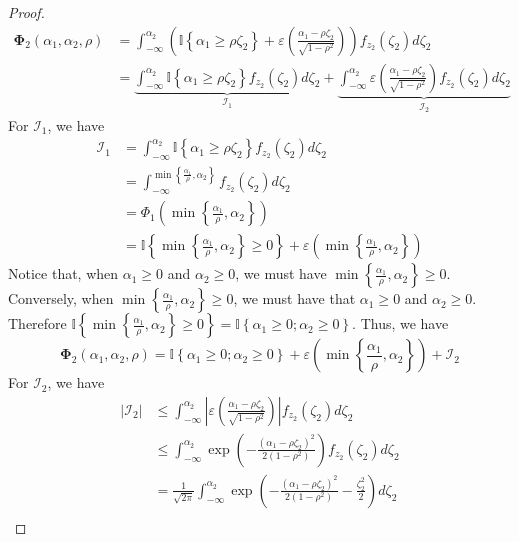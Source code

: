 \documentclass[10pt]{article} %
\theoremstyle{definition}
\theoremstyle{plain}
\newcommand{\paren}[1]{\left(#1\right)}
\begin{document}
\begin{proof}
\begin{align*}
        \bm{\Phi}_2\paren{\alpha_1,\alpha_2,\rho} & = \int_{-\infty}^{\alpha_2}\paren{\mathbb{I}\left\{\alpha_1 \geq \rho\zeta_2\right\} + \varepsilon\paren{\frac{\alpha_1 - \rho\zeta_2}{\sqrt{1 - \rho^2}}}}f_{z_2}\paren{\zeta_2}d\zeta_2\\
        & = \underbrace{\int_{-\infty}^{\alpha_2}\mathbb{I}\left\{\alpha_1 \geq \rho\zeta_2\right\}f_{z_2}\paren{\zeta_2}d\zeta_2}_{\mathcal{I}_1} +  \underbrace{\int_{-\infty}^{\alpha_2}\varepsilon\paren{\frac{\alpha_1 - \rho\zeta_2}{\sqrt{1 - \rho^2}}}f_{z_2}\paren{\zeta_2}d\zeta_2}_{\mathcal{I}_2}
    \end{align*}
    For $\mathcal{I}_1$, we have
    \begin{align*}
        \mathcal{I}_1 & = \int_{-\infty}^{\alpha_2}\mathbb{I}\left\{\alpha_1 \geq \rho\zeta_2\right\}f_{z_2}\paren{\zeta_2}d\zeta_2\\
        & = \int_{-\infty}^{\min\left\{\frac{\alpha_1}{\rho},\alpha_2\right\}}f_{z_2}\paren{\zeta_2}d\zeta_2\\
        & = \Phi_1\paren{\min\left\{\frac{\alpha_1}{\rho},\alpha_2\right\}}\\
        & = \mathbb{I}\left\{\min\left\{\frac{\alpha_1}{\rho},\alpha_2\right\} \geq 0\right\} + \varepsilon\paren{\min\left\{\frac{\alpha_1}{\rho},\alpha_2\right\}}
    \end{align*}
    Notice that, when $\alpha_1 \geq 0$ and $\alpha_2\geq 0$, we must have $\min\left\{\frac{\alpha_1}{\rho},\alpha_2\right\}\geq 0$. Conversely, when $\min\left\{\frac{\alpha_1}{\rho},\alpha_2\right\} \geq 0$, we must have that $\alpha_1\geq 0$ and $\alpha_2\geq 0$. Therefore $\mathbb{I}\left\{\min\left\{\frac{\alpha_1}{\rho},\alpha_2\right\} \geq 0\right\} = \mathbb{I}\left\{\alpha_1\geq 0;\alpha_2\geq 0\right\}$. Thus, we have
    \[
        \bm{\Phi}_2\paren{\alpha_1,\alpha_2,\rho} = \mathbb{I}\left\{\alpha_1\geq 0;\alpha_2\geq 0\right\} + \varepsilon\paren{\min\left\{\frac{\alpha_1}{\rho},\alpha_2\right\}} + \mathcal{I}_2
    \]
    For $\mathcal{I}_2$, we have
    \begin{align*}
        \left|\mathcal{I}_2\right| & \leq \int_{-\infty}^{\alpha_2}\left|\varepsilon\paren{\frac{\alpha_1 - \rho\zeta_2}{\sqrt{1 - \rho^2}}}\right|f_{z_2}\paren{\zeta_2}d\zeta_2\\
        & \leq \int_{-\infty}^{\alpha_2}\exp\paren{-\frac{\paren{\alpha_1 - \rho\zeta_2}^2}{2(1 - \rho^2)}}f_{z_2}\paren{\zeta_2}d\zeta_2\\
        & = \frac{1}{\sqrt{2\pi}}\int_{-\infty}^{\alpha_2}\exp\paren{-\frac{\paren{\alpha_1 - \rho\zeta_2}^2}{2(1 - \rho^2)} - \frac{\zeta_2^2}{2}}d\zeta_2\\

\end{align*}
\end{proof}
\end{document}
